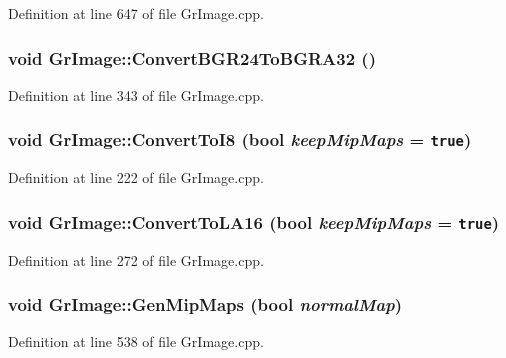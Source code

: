 \begin{CompactItemize}
Definition at line 647 of file GrImage.cpp.\hypertarget{class_gr_image_9529693888abcb6afa1831800d70274c}{
\subsubsection[{ConvertBGR24ToBGRA32}]{\setlength{\rightskip}{0pt plus 5cm}void GrImage::ConvertBGR24ToBGRA32 ()}}
\label{class_gr_image_9529693888abcb6afa1831800d70274c}




Definition at line 343 of file GrImage.cpp.\hypertarget{class_gr_image_3e3182e9acf5bd5b9c93364a260823a1}{
\subsubsection[{ConvertToI8}]{\setlength{\rightskip}{0pt plus 5cm}void GrImage::ConvertToI8 (bool {\em keepMipMaps} = {\tt true})}}
\label{class_gr_image_3e3182e9acf5bd5b9c93364a260823a1}




Definition at line 222 of file GrImage.cpp.\hypertarget{class_gr_image_f47bb843809a5cba9433c78887dc86b5}{
\subsubsection[{ConvertToLA16}]{\setlength{\rightskip}{0pt plus 5cm}void GrImage::ConvertToLA16 (bool {\em keepMipMaps} = {\tt true})}}
\label{class_gr_image_f47bb843809a5cba9433c78887dc86b5}




Definition at line 272 of file GrImage.cpp.\hypertarget{class_gr_image_7e0b6426aaba56cdda4ae76cd394d863}{
\subsubsection[{GenMipMaps}]{\setlength{\rightskip}{0pt plus 5cm}void GrImage::GenMipMaps (bool {\em normalMap})}}
\label{class_gr_image_7e0b6426aaba56cdda4ae76cd394d863}




Definition at line 538 of file GrImage.cpp.\hypertarget{class_gr_image_b1d89088b96f628d59c886e1224f5ac2}{
}
\end{CompactItemize}
